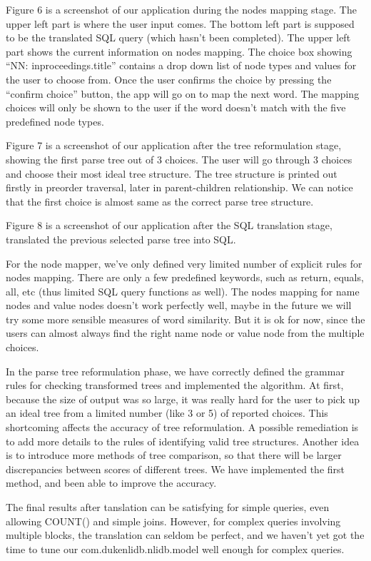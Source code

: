 \documentclass[twocolumn]{article}
\begin{document}
Figure 6 is a screenshot of our application during the nodes mapping stage. The upper left part is where the user input comes. The bottom left part is supposed to be the translated SQL query (which hasn’t been completed). The upper left part shows the current information on nodes mapping. The choice box showing “NN: inproceedings.title” contains a drop down list of node types and values for the user to choose from. Once the user confirms the choice by pressing the “confirm choice” button, the app will go on to map the next word. The mapping choices will only be shown to the user if the word doesn’t match with the five predefined node types.

Figure 7 is a screenshot of our application after the tree reformulation stage, showing the first parse tree out of 3 choices. The user will go through 3 choices and choose their most ideal tree structure. The tree structure is printed out firstly in preorder traversal, later in parent-children relationship. We can notice that the first choice is almost same as the correct parse tree structure.

Figure 8 is a screenshot of our application after the SQL translation stage, translated the previous selected parse tree into SQL.

For the node mapper, we’ve only defined very limited number of explicit rules for nodes mapping. There are only a few predefined keywords, such as return, equals, all, etc (thus limited SQL query functions as well). The nodes mapping for name nodes and value nodes doesn’t work perfectly well, maybe in the future we will try some more sensible measures of word similarity. But it is ok for now, since the users can almost always find the right name node or value node from the multiple choices. 

In the parse tree reformulation phase, we have correctly defined the grammar rules for checking transformed trees and implemented the algorithm. At first, because the size of output was so large, it was really hard for the user to pick up an ideal tree from a limited number (like 3 or 5) of reported choices. This shortcoming affects the accuracy of tree reformulation. A possible remediation is to add more details to the rules of identifying valid tree structures. Another idea is to introduce more methods of tree comparison, so that there will be larger discrepancies between scores of different trees. We have implemented the first method, and been able to improve the accuracy.

The final results after tanslation can be satisfying for simple queries, even allowing COUNT() and simple joins. However, for complex queries involving multiple blocks, the translation can seldom be perfect, and we haven't yet got the time to tune our com.dukenlidb.nlidb.model well enough for complex queries.
\end{document}
